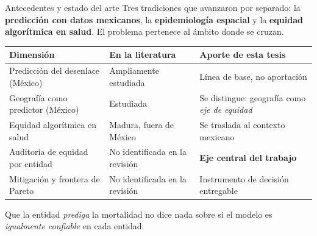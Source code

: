 \documentclass[aspectratio=169,11pt]{beamer}
\newcommand{\resalta}[1]{{\color{vino}\bfseries #1}}
\begin{document}
\begin{frame}{Antecedentes y estado del arte}
  \vspace{0.2em}
  {\footnotesize Tres tradiciones que avanzaron por separado: la
  \resalta{predicción con datos mexicanos}, la \resalta{epidemiología espacial}
  y la \resalta{equidad algorítmica en salud}. El problema pertenece al ámbito
  donde se cruzan.}

  \vspace{0.6em}
  \centering
  \renewcommand{\arraystretch}{1.20}
  {\footnotesize
  \begin{tabular}{p{4.4cm} p{3.4cm} p{4.6cm}}
    \toprule
    \textbf{Dimensión} & \textbf{En la literatura} & \textbf{Aporte de esta tesis}\\
    \midrule
    Predicción del desenlace (México) & Ampliamente estudiada &
      Línea de base, no aportación\\
    Geografía como predictor (México) & Estudiada &
      Se distingue: geografía como \textit{eje de equidad}\\
    Equidad algorítmica en salud & Madura, fuera de México &
      Se traslada al contexto mexicano\\
    \rowcolor{clarito} Auditoría de equidad por entidad & No identificada en la revisión &
      \textbf{Eje central del trabajo}\\
    \rowcolor{clarito} Mitigación y frontera de Pareto & No identificada en la revisión &
      Instrumento de decisión entregable\\
    \bottomrule
  \end{tabular}}

  \vspace{0.6em}
  {\footnotesize\color{humo} Que la entidad \textit{prediga} la mortalidad no
  dice nada sobre si el modelo es \textit{igualmente confiable} en cada entidad.}
\end{frame}
\end{document}
